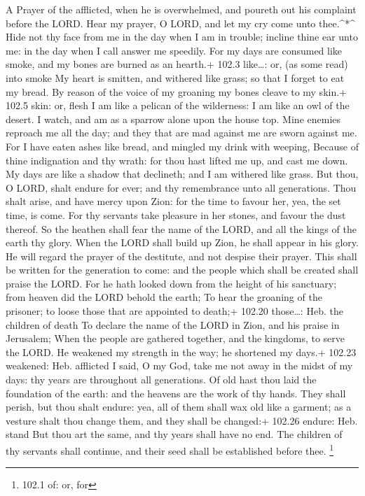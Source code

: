 A Prayer of the afflicted, when he is overwhelmed, and poureth out his
complaint before the LORD.  Hear my prayer, O LORD, and let
my cry come unto thee.\^{}*\^{}  Hide not thy face from me
in the day when I am in trouble; incline thine ear unto me: in the day
when I call answer me speedily.  For my days are consumed
like smoke, and my bones are burned as an hearth.+ 102.3 like\ldots: or,
(as some read) into smoke  My heart is smitten, and withered
like grass; so that I forget to eat my bread.  By reason of
the voice of my groaning my bones cleave to my skin.+ 102.5 skin: or,
flesh  I am like a pelican of the wilderness: I am like an
owl of the desert.  I watch, and am as a sparrow alone upon
the house top.  Mine enemies reproach me all the day; and
they that are mad against me are sworn against me.  For I
have eaten ashes like bread, and mingled my drink with weeping,
 Because of thine indignation and thy wrath: for thou hast
lifted me up, and cast me down.  My days are like a shadow
that declineth; and I am withered like grass.  But thou, O
LORD, shalt endure for ever; and thy remembrance unto all generations.
 Thou shalt arise, and have mercy upon Zion: for the time
to favour her, yea, the set time, is come.  For thy
servants take pleasure in her stones, and favour the dust thereof.
 So the heathen shall fear the name of the LORD, and all
the kings of the earth thy glory.  When the LORD shall
build up Zion, he shall appear in his glory.  He will
regard the prayer of the destitute, and not despise their prayer.
 This shall be written for the generation to come: and the
people which shall be created shall praise the LORD.  For
he hath looked down from the height of his sanctuary; from heaven did
the LORD behold the earth;  To hear the groaning of the
prisoner; to loose those that are appointed to death;+ 102.20
those\ldots: Heb. the children of death  To declare the
name of the LORD in Zion, and his praise in Jerusalem; 
When the people are gathered together, and the kingdoms, to serve the
LORD.  He weakened my strength in the way; he shortened my
days.+ 102.23 weakened: Heb. afflicted  I said, O my God,
take me not away in the midst of my days: thy years are throughout all
generations.  Of old hast thou laid the foundation of the
earth: and the heavens are the work of thy hands.  They
shall perish, but thou shalt endure: yea, all of them shall wax old like
a garment; as a vesture shalt thou change them, and they shall be
changed:+ 102.26 endure: Heb. stand  But thou art the same,
and thy years shall have no end.  The children of thy
servants shall continue, and their seed shall be established before
thee. \footnote{102.1 of: or, for}

